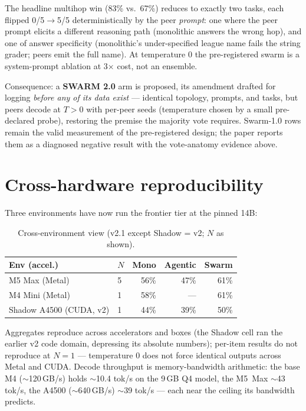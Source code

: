 \documentclass[sigconf,nonacm]{acmart}
\begin{document}
The headline multihop win (83\% vs.\ 67\%) reduces to exactly two tasks, each flipped
0/5$\to$5/5 deterministically by the peer \emph{prompt}: one where the peer prompt
elicits a different reasoning path (monolithic answers the wrong hop), and one of
answer specificity (monolithic's under-specified league name fails the string grader;
peers emit the full name). At temperature 0 the pre-registered swarm is a
system-prompt ablation at 3$\times$ cost, not an ensemble.

Consequence: a \textbf{SWARM 2.0} arm is proposed, its amendment drafted for logging
\emph{before any of its data exist} --- identical topology, prompts, and tasks, but
peers decode at $T{>}0$ with per-peer seeds (temperature chosen by a small
pre-declared probe), restoring the premise the majority vote requires. Swarm-1.0 rows remain the valid measurement of the
pre-registered design; the paper reports them as a diagnosed negative result with the
vote-anatomy evidence above.

\section{Cross-hardware reproducibility}
Three environments have now run the frontier tier at the pinned 14B:

\begin{table}[h]
\caption{Cross-environment view (v2.1 except Shadow = v2; $N$ as shown).}
\label{tab:xenv}
\begin{tabular}{llrrr}
\toprule
Env (accel.) & $N$ & Mono & Agentic & Swarm\\
\midrule
M5 Max (Metal)   & 5 & 56\% & 47\% & 61\%\\
M4 Mini (Metal)  & 1 & 58\% & --- & 61\%\\
Shadow A4500 (CUDA, v2) & 1 & 44\% & 39\% & 50\%\\
\bottomrule
\end{tabular}
\end{table}

Aggregates reproduce across accelerators and boxes (the Shadow cell ran the earlier v2
code domain, depressing its absolute numbers); per-item results do not reproduce at
$N{=}1$ --- temperature 0 does not force identical outputs across Metal and CUDA.
Decode throughput is memory-bandwidth arithmetic: the base M4 ($\sim$120\,GB/s) holds
$\sim$10.4 tok/s on the 9\,GB Q4 model, the M5~Max $\sim$43 tok/s, the A4500
($\sim$640\,GB/s) $\sim$39 tok/s --- each near the ceiling its bandwidth predicts.
\end{document}
